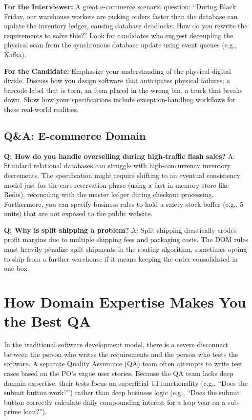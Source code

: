 \documentclass[
  11pt,
  openany,
  oneside]{book}
\renewenvironment{quote}{\begin{customquote}}{\end{customquote}}
\begin{document}
\begin{quote}
\textbf{For the Interviewer:} A great e-commerce scenario question:
``During Black Friday, our warehouse workers are picking orders faster
than the database can update the inventory ledger, causing database
deadlocks. How do you rewrite the requirements to solve this?'' Look for
candidates who suggest decoupling the physical scan from the synchronous
database update using event queues (e.g., Kafka).
\end{quote}

\begin{quote}
\textbf{For the Candidate:} Emphasize your understanding of the
physical-digital divide. Discuss how you design software that
anticipates physical failures: a barcode label that is torn, an item
placed in the wrong bin, a truck that breaks down. Show how your
specifications include exception-handling workflows for these real-world
realities.
\end{quote}

\subsection{Q\&A: E-commerce Domain}\label{qa-e-commerce-domain}

\textbf{Q: How do you handle overselling during high-traffic flash
sales?} A: Standard relational databases can struggle with
high-concurrency inventory decrements. The specification might require
shifting to an eventual consistency model just for the cart reservation
phase (using a fast in-memory store like Redis), reconciling with the
master ledger during checkout processing. Furthermore, you can specify
business rules to hold a safety stock buffer (e.g., 5 units) that are
not exposed to the public website.

\textbf{Q: Why is split shipping a problem?} A: Split shipping
drastically erodes profit margins due to multiple shipping fees and
packaging costs. The DOM rules must heavily penalize split shipments in
the routing algorithm, sometimes opting to ship from a further warehouse
if it means keeping the order consolidated in one box.

\bigskip

\section{How Domain Expertise Makes You the Best
QA}\label{how-domain-expertise-makes-you-the-best-qa}

In the traditional software development model, there is a severe
disconnect between the person who writes the requirements and the person
who tests the software. A separate Quality Assurance (QA) team often
attempts to write test cases based on the PO's vague user stories.
Because the QA team lacks deep domain expertise, their tests focus on
superficial UI functionality (e.g., ``Does the submit button work?'')
rather than deep business logic (e.g., ``Does the submit button
correctly calculate daily compounding interest for a leap year on a
sub-prime loan?'').
\end{document}
